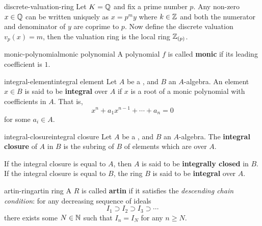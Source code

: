 \begin{example}{discrete-valuation-ring}
    Let $K = \mathbb{Q}$ and fix a prime number $p$. Any non-zero $x \in \mathbb{Q}$ can be written uniquely as $x = p^m y$ where $k \in \mathbb{Z}$ and both the numerator and denominator of $y$ are coprime to $p$. Now define the discrete valuation $v_p(x) = m$, then the valuation ring is the local ring $\mathbb{Z}_{(p)}$.
\end{example}


\begin{topic}{monic-polynomial}{monic polynomial}
    A polynomial $f$ is called \textbf{monic} if its leading coefficient is $1$.
\end{topic}

\begin{topic}{integral-element}{integral element}
    Let $A$ be a , and $B$ an $A$-algebra. An element $x \in B$ is said to be \textbf{integral} over $A$ if $x$ is a root of a monic polynomial with coefficients in $A$. That is,
    \[ x^n + a_1 x^{n - 1} + \cdots + a_n = 0 \]
    for some $a_i \in A$.
\end{topic}

\begin{topic}{integral-closure}{integral closure}
    Let $A$ be a , and $B$ an $A$-algebra. The \textbf{integral closure} of $A$ in $B$ is the subring of $B$ of elements which are  over $A$.
    
    If the integral closure is equal to $A$, then $A$ is said to be \textbf{integrally closed} in $B$. If the integral closure is equal to $B$, the ring $B$ is said to be \textbf{integral} over $A$.
\end{topic}

\begin{topic}{artin-ring}{artin ring}
    A  $R$ is called \textbf{artin} if it satisfies the \textit{descending chain condition}: for any decreasing sequence of ideals
    \[ I_1 \supset I_2 \supset I_3 \supset \cdots \]
    there exists some $N \in \mathbb{N}$ such that $I_n = I_N$ for any $n \ge N$.
\end{topic}

